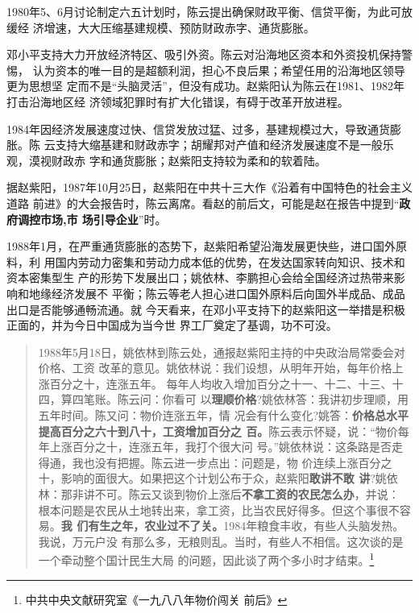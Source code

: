 1980年5、6月讨论制定六五计划时，陈云提出确保财政平衡、信贷平衡，为此可放缓经
济增速，大大压缩基建规模、预防财政赤字、通货膨胀。

邓小平支持大力开放经济特区、吸引外资。陈云对沿海地区资本和外资投机保持警惕，
认为资本的唯一目的是超额利润，担心不良后果；希望任用的沿海地区领导更为思想坚
定而不是“头脑灵活”，但没有成功。赵紫阳认为陈云在1981、1982年打击沿海地区经
济领域犯罪时有扩大化错误，有碍于改革开放进程。

1984年因经济发展速度过快、信贷发放过猛、过多，基建规模过大，导致通货膨胀。陈
云支持大缩基建和财政赤字；胡耀邦对产值和经济发展速度不是一般乐观，漠视财政赤
字和通货膨胀；赵紫阳支持较为柔和的软着陆。


据赵紫阳，1987年10月25日，赵紫阳在中共十三大作《沿着有中国特色的社会主义道路
前进》的大会报告时，陈云离席。看赵的前后文，可能是赵在报告中提到“\textbf{政府调控市场,市
  场引导企业}”时。

1988年1月，在严重通货膨胀的态势下，赵紫阳希望沿海发展更快些，进口国外原料，利
用国内劳动力密集和劳动力成本低的优势，在发达国家转向知识、技术和资本密集型生
产的形势下发展出口；姚依林、李鹏担心会给全国经济过热带来影响和地缘经济发展不
平衡；陈云等老人担心进口国外原料后向国外半成品、成品出口是否能够通畅流通。就
今天看来，在邓小平支持下的赵紫阳这一举措是积极正面的，并为今日中国成为当今世
界工厂奠定了基调，功不可没。

\begin{quotation}
  1988年5月18日，姚依林到陈云处，通报赵紫阳主持的中央政治局常委会对价格、工资
  改革的意见。姚依林说：我们设想，从明年开始，每年价格上涨百分之十，连涨五年。
  每年人均收入增加百分之十一、十二、十三、十四，算四笔账。陈云问：你看可
  以\textbf{理顺价格}?姚依林答：我讲初步理顺，用五年时间。陈又问：物价连涨五年，情
  况会有什么变化?姚答：\textbf{价格总水平提高百分之六十到八十，工资增加百分之
    百。}陈云表示怀疑，说：“物价每年上涨百分之十，连涨五年，我打个很大问
  号。”姚依林说：这条路是否走得通，我也没有把握。陈云进一步点出：问题是，物
  价连续上涨百分之十，影响的面很大。如果把这个计划公布于众，赵紫阳\textbf{敢讲不敢
    讲}?姚依林：那非讲不可。陈云又谈到物价上涨后\textbf{不拿工资的农民怎么办}，并说：
  根本问题是农民从土地转出来，拿工资，比当农民好得多。但这个事很不容易。\textbf{我
    们有生之年，农业过不了关。}1984年粮食丰收，有些人头脑发热。我说，万元户没
  有那么多，无粮则乱。当时，有些人不相信。这次谈的是一个牵动整个国计民生大局
  的问题，因此谈了两个多小时才结束。\footnote{中共中央文献研究室《一九八八年物价闯关
    前后》}
\end{quotation}

